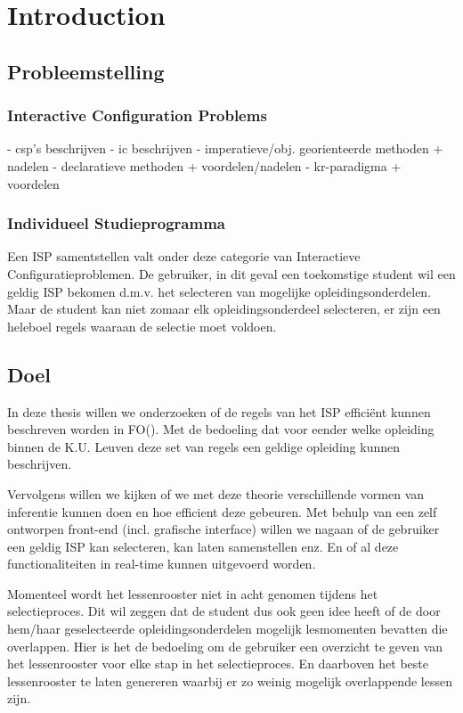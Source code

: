 \chapter{Introduction}
\label{cha:intro}

\section{Probleemstelling}

\subsection{Interactive Configuration Problems}
- csp's beschrijven
- ic beschrijven
- imperatieve/obj. georienteerde methoden + nadelen
- declaratieve methoden + voordelen/nadelen
- kr-paradigma + voordelen

\subsection{Individueel Studieprogramma}
Een ISP samentstellen valt onder deze categorie van Interactieve Configuratieproblemen. 
De gebruiker, in dit geval een toekomstige student wil een geldig ISP bekomen d.m.v. het selecteren van mogelijke opleidingsonderdelen. Maar de student kan niet zomaar elk opleidingsonderdeel selecteren, er zijn een heleboel regels waaraan de selectie moet voldoen. 

\section{Doel}
In deze thesis willen we onderzoeken of de regels van het ISP effici\"{e}nt kunnen beschreven worden in FO(\textperiodcentered). Met de bedoeling dat voor eender welke opleiding binnen de K.U. Leuven deze set van regels een geldige opleiding kunnen beschrijven. 

Vervolgens willen we kijken of we met deze theorie verschillende vormen van inferentie kunnen doen en hoe efficient deze gebeuren. Met behulp van een zelf ontworpen front-end (incl. grafische interface) willen we nagaan of de gebruiker een geldig ISP kan selecteren, kan laten samenstellen enz. En of al deze functionaliteiten in real-time kunnen uitgevoerd worden.

Momenteel wordt het lessenrooster niet in acht genomen tijdens het selectieproces. Dit wil zeggen dat de student dus ook geen idee heeft of de door hem/haar geselecteerde opleidingsonderdelen mogelijk lesmomenten bevatten die overlappen. 
Hier is het de bedoeling om de gebruiker een overzicht te geven van het lessenrooster voor elke stap in het selectieproces. En daarboven het beste lessenrooster te laten genereren waarbij er zo weinig mogelijk overlappende lessen zijn.

